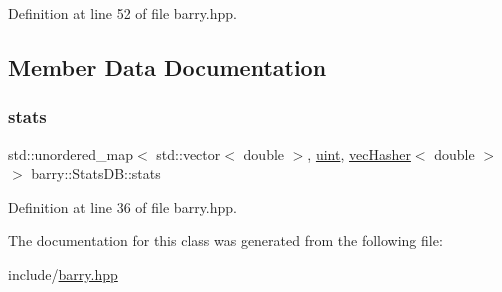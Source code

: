 Definition at line 52 of file barry.\+hpp.



\subsection{Member Data Documentation}
\mbox{\label{classbarry_1_1_stats_d_b_a37af92a5d40cd2582446d86209ea7f26}} 
\subsubsection{\texorpdfstring{stats}{stats}}
{\footnotesize\ttfamily std\+::unordered\+\_\+map$<$ std\+::vector$<$ double $>$, \hyperlink{namespacebarry_a11dfc53ddb4672278319aa04f1e09a6c}{uint}, \hyperlink{structbarry_1_1vec_hasher}{vec\+Hasher}$<$ double $>$ $>$ barry\+::\+Stats\+D\+B\+::stats}



Definition at line 36 of file barry.\+hpp.



The documentation for this class was generated from the following file\+:\begin{DoxyCompactItemize}
\item 
include/\hyperlink{barry_8hpp}{barry.\+hpp}\end{DoxyCompactItemize}
